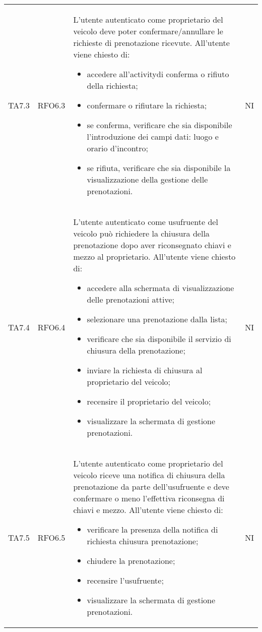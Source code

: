 \begin{longtable}{ >{\centering}p{} >{\centering}p{} >{\centering}p{}
			>{\centering}p{}}
	 	TA7.3 & RFO6.3 & L'utente autenticato come proprietario del veicolo deve poter confermare/annullare le richieste di prenotazione ricevute. All'utente viene chiesto di:
	 	\begin{itemize}
	 		\item accedere all'activity\glosp di conferma o rifiuto della richiesta;
	 		\item confermare o rifiutare la richiesta;
	 		\item se conferma, verificare che sia disponibile l'introduzione dei campi dati: luogo e orario d'incontro;
	 		\item se rifiuta, verificare che sia disponibile la visualizzazione della gestione delle prenotazioni.
	 	\end{itemize}	&	NI	\tabularnewline
 		TA7.4 &	RFO6.4 &	L'utente autenticato come usufruente del veicolo può richiedere la chiusura della prenotazione dopo aver riconsegnato chiavi e mezzo al proprietario. All'utente viene chiesto di:
 		\begin{itemize}
 			\item accedere alla schermata di visualizzazione delle prenotazioni attive;
 			\item selezionare una prenotazione dalla lista;
 			\item verificare che sia disponibile il servizio di chiusura della prenotazione;
 			\item inviare la richiesta di chiusura al proprietario del veicolo;
 			\item recensire il proprietario del veicolo;
 			\item visualizzare la schermata di gestione prenotazioni.
 		\end{itemize}	&	NI	\tabularnewline
 		TA7.5 & RFO6.5 &	L'utente autenticato come proprietario del veicolo riceve una notifica di chiusura della prenotazione da parte dell'usufruente e deve confermare o meno l'effettiva riconsegna di chiavi e mezzo. All'utente viene chiesto di:
 		\begin{itemize}
 			\item verificare la presenza della notifica di richiesta chiusura prenotazione;
 			\item chiudere la prenotazione;
 			\item recensire l'usufruente;
 			\item visualizzare la schermata di gestione prenotazioni.	
 		\end{itemize}	&	NI	\tabularnewline
 				

\end{longtable}
